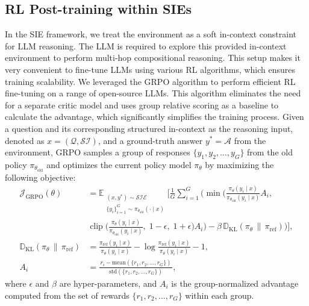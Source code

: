 \documentclass{article} %
\begin{document}
\subsection{RL Post-training within SIEs}
In the SIE framework, we treat the environment as a soft in-context constraint for LLM reasoning. The LLM is required to explore this provided in-context environment to perform multi-hop compositional reasoning. This setup makes it very convenient to fine-tune LLMs using various RL algorithms, which ensures training scalability. We leveraged the GRPO algorithm \citep{shao2024deepseekmath} to perform efficient RL fine-tuning on a range of open-source LLMs. This algorithm eliminates the need for a separate critic model and uses group relative scoring as a baseline to calculate the advantage, which significantly simplifies the training process. 
Given a question and its corresponding structured in-context as the reasoning input, denoted as $x = (\mathcal{Q}, \mathcal{SI})$, and a ground-truth answer $y^* = \mathcal{A}$ from the environment, GRPO samples a group of responses $\{y_1, y_2, \dots, y_G\}$ from the old policy $\pi_{\theta_{\text{old}}}$ and optimizes the current policy model $\pi_{\theta}$ by maximizing the following objective:
\vspace{-5pt}
{\small
\begin{subequations}
\begin{align}
\mathcal{J}_{\text{GRPO}}(\theta)
&= \mathbb{E}_{\substack{(x, y^*) \sim \mathcal{SIE} \\ \{y_i\}_{i=1}^G \sim \pi_{\theta_{\text{old}}}(\cdot \mid x)}} \Big[
 \tfrac{1}{G}\sum_{i=1}^G 
 \Big(
   \min\!\Big(
     \frac{\pi_\theta(y_i \mid x)}{\pi_{\theta_{\text{old}}}(y_i \mid x)} A_i,\;
 \nonumber \\
&\hspace{0pt}
     \operatorname{clip}\!\Big(
       \frac{\pi_\theta(y_i \mid x)}{\pi_{\theta_{\text{old}}}(y_i \mid x)},\;
       1-\epsilon,\;1+\epsilon
     \Big) A_i
   \Big)
   - \beta\, \mathbb{D}_{\text{KL}}(\pi_\theta \,\|\, \pi_{\text{ref}})
 \Big)
\Big], \label{eq:grpo} \\[6pt]
\mathbb{D}_{\text{KL}}(\pi_\theta \,\|\, \pi_{\text{ref}})
&= \frac{\pi_{\text{ref}}(y_i \mid x)}{\pi_\theta(y_i \mid x)}
  - \log\!\frac{\pi_{\text{ref}}(y_i \mid x)}{\pi_\theta(y_i \mid x)} - 1,
\label{eq:grpo-kl} \\[6pt]
A_i
&= \frac{\,r_i - \mathrm{mean}(\{r_1, r_2, \ldots, r_G\})\,}
        {\,\mathrm{std}(\{r_1, r_2, \ldots, r_G\})\,},
\label{eq:grpo-advantage}
\end{align}
\end{subequations}
}
where $\epsilon$ and $\beta$ are hyper-parameters, and $A_i$ is the 
group-normalized advantage computed from the set of rewards 
$\{r_1, r_2, \ldots, r_G\}$ within each group. 
\end{document}
